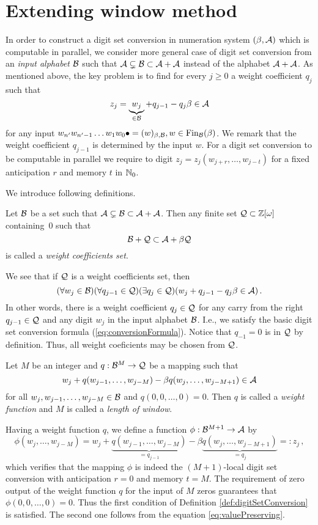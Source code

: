 \section{Extending window method}
\label{sec:methodDescription}
In order to construct a digit set conversion in numeration system $(\beta,\mathcal{A})$ which is computable in parallel, we consider more general case of digit set conversion from an \emph{input alphabet} $\mathcal{B}$ such that $\mathcal{A} \subsetneq \mathcal{B} \subset \mathcal{A} +\mathcal{A}$ instead of the alphabet $\mathcal{A}+\mathcal{A}$.
As mentioned above, the key problem is to find for every $j\geq 0$ a weight coefficient $q_j$ such that 
    $$
        z_j=\underbrace{w_j}_{\in \mathcal{B}} + q_{j-1} - q_j \beta \in \mathcal{A} 
    $$  
    for any input $w_{n'}w_{n'-1}\dots w_1 w_0 \bullet=(w)_{\beta,\mathcal{B}}, w\in \text{Fin}_{\mathcal{B}}(\beta)$. We remark that the weight coefficient $q_{j-1}$ is determined by the input $w$. For a digit set conversion to be computable in parallel we require to digit $z_j=z_j(w_{j+r},\dots,w_{j-t})$ for a fixed anticipation $r$ and memory $t$ in $\mathbb{N}_0$.
    
    We introduce following definitions. 
    \begin{defn}
    \label{def:weightCoefficientsSet}
        Let $\mathcal{B}$ be a set such that $\mathcal{A} \subsetneq \mathcal{B} \subset \mathcal{A} +\mathcal{A}$. Then any finite set $\mathcal{Q}\subset\mathbb{Z}[\omega]$ containing~0 such that 
        $$
            \mathcal{B} + \mathcal{Q} \subset \mathcal{A} + \beta \mathcal{Q}
        $$  
        is called a \emph{weight coefficients set}.
    \end{defn}
    We see that if $\mathcal{Q}$ is a weight coefficients set, then
        $$
        (\forall w_j \in \mathcal{B})(\forall q_{j-1}\in\mathcal{Q})(\exists q_j \in \mathcal{Q} )(w_j + q_{j-1} - q_j \beta \in \mathcal{A} )\,.
        $$
    In other words, there is a weight coefficient $q_j \in \mathcal{Q}$ for any carry from the right $q_{j-1}\in \mathcal{Q}$ and any digit $w_j$ in the input alphabet $\mathcal{B}$. I.e., we  satisfy the basic digit set conversion formula (\ref{eq:conversionFormula}). Notice that $q_{-1}=0$ is in $\mathcal{Q}$ by definition. Thus, all weight coeficients may be chosen from $\mathcal{Q}$.
    \begin{defn}
    Let $M$ be an integer and $q:\mathcal{B}^{M} \rightarrow \mathcal{Q}$ be a mapping such that 
    $$
    w_j+ q(w_{j-1}, \dots, w_{j-M}) - \beta q(w_j, \dots, w_{j-M+1}) \in \mathcal{A}
    $$
    for all $w_j,w_{j-1}, \dots, w_{j-M} \in \mathcal{B}$ and $q(0,0,\dots,0)=0$. Then $q$ is called a \emph{weight function} and $M$ is called a \emph{length of window}.    
    \end{defn}

 Having a weight function $q$, we define a function $\phi:\mathcal{B}^{M+1}\rightarrow \mathcal{A}$ by
    \begin{equation}
    \label{eq:localConversion}
        \phi(w_{j}, \dots, w_{j-M})=w_j+ \underbrace{q(w_{j-1}, \dots, w_{j-M})}_{=q_{j-1}} - \beta \underbrace{q(w_j, \dots, w_{j-M+1})}_{=q_j}=:z_j\,,
    \end{equation} 
    which verifies that the mapping $\phi$ is indeed the $(M+1)$-local digit set conversion with anticipation $r=0$ and memory $t=M$. The requirement of zero output of the weight function $q$ for the input of $M$ zeros guarantees that $\phi(0,0,\dots,0)=0$. Thus the first condition of Definition \ref{def:digitSetConversion} is satisfied. The second one follows from the equation \ref{eq:valuePreserving}. 
    

